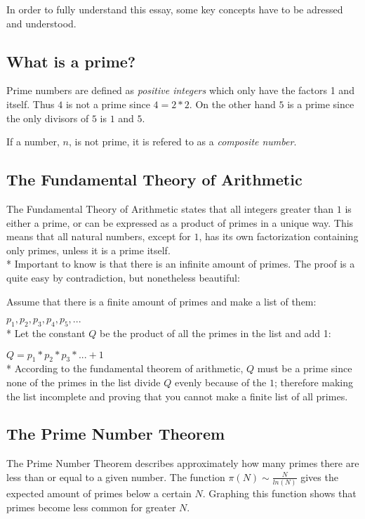 \documentclass[main.tex]{subfiles}
\begin{document}
In order to fully understand this essay, some key concepts have to be adressed and understood.

\subsection{What is a prime?}
Prime numbers are defined as \textit{positive integers} which only have the factors 1 and itself. Thus $4$ is not a prime since $4 = 2 * 2$. On the other hand $5$ is a prime since the only divisors of $5$ is $1$ and $5$. 

If a number, $n$, is not prime, it is refered to as a \textit{composite number}.

\subsection{The Fundamental Theory of Arithmetic}
The Fundamental Theory of Arithmetic \cite{theorem:arithmetic} states that all integers greater than $1$ is either a prime, or can be expressed as a product of primes in a unique way. This means that all natural numbers, except for $1$, has its own factorization containing only primes, unless it is a prime itself.
\newline
\\*
Important to know is that there is an infinite amount of primes. The proof is a quite easy by contradiction, but nonetheless beautiful:

\begin{mdframed}
    Assume that there is a finite amount of primes and make a list of them:

    $p_1, p_2, p_3, p_4, p_5, ...$ 
    \newline
    \\*
    Let the constant $Q$ be the product of all the primes in the list and add 1:

    $Q = p_1 * p_2 * p_3 * ... + 1$
    \newline
    \\*
    According to the fundamental theorem of arithmetic, $Q$ must be a prime since none of the primes in the list divide $Q$ evenly because of the $1$; therefore making the list incomplete and proving that you cannot make a finite list of all primes. 
\end{mdframed}

\subsection{The Prime Number Theorem}
The Prime Number Theorem \cite{theorem:prime_num} describes approximately how many primes there are less than or equal to a given number. The function $\pi(N) \sim \frac{N}{ln(N)}$ gives the expected amount of primes below a certain $N$. Graphing this function shows that primes become less common for greater $N$.
\end{document}
